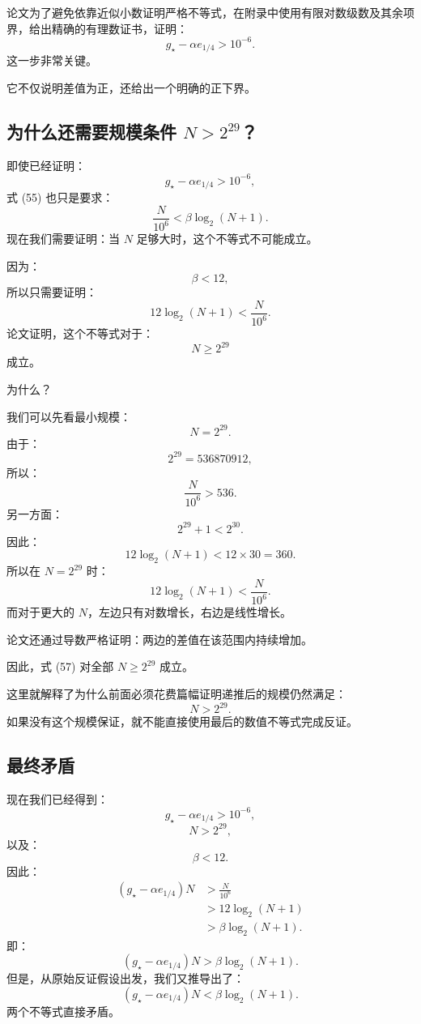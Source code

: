 \documentclass[UTF8,11pt]{ctexart}
\begin{document}
论文为了避免依靠近似小数证明严格不等式，在附录中使用有限对数级数及其余项界，给出精确的有理数证书，证明：
\begin{equation}\boxed{g_\star-\alpha e_{1/4}>10^{-6}.}\tag{56}\end{equation}
这一步非常关键。

它不仅说明差值为正，还给出一个明确的正下界。

\subsection{为什么还需要规模条件 $N>2^{29}$？}
即使已经证明：
\[g_\star-\alpha e_{1/4}>10^{-6},\]
式 (55) 也只是要求：
\[\frac{N}{10^6}<\beta\log_2(N+1).\]
现在我们需要证明：当 $N$ 足够大时，这个不等式不可能成立。

因为：
\[\beta<12,\]
所以只需要证明：
\begin{equation}\boxed{12\log_2(N+1)<\frac{N}{10^6}.}\tag{57}\end{equation}
论文证明，这个不等式对于：
\[N\ge2^{29}\]
成立。

为什么？

我们可以先看最小规模：
\[N=2^{29}.\]
由于：
\[2^{29}=536870912,\]
所以：
\[\frac N{10^6}>536.\]
另一方面：
\[2^{29}+1<2^{30}.\]
因此：
\[12\log_2(N+1)<12\times30=360.\]
所以在 $N=2^{29}$ 时：
\[12\log_2(N+1)<\frac N{10^6}.\]
而对于更大的 $N$，左边只有对数增长，右边是线性增长。

论文还通过导数严格证明：两边的差值在该范围内持续增加。

因此，式 (57) 对全部 $N\ge2^{29}$ 成立。

这里就解释了为什么前面必须花费篇幅证明递推后的规模仍然满足：
\[N>2^{29}.\]
如果没有这个规模保证，就不能直接使用最后的数值不等式完成反证。

\subsection{最终矛盾}
现在我们已经得到：
\[g_\star-\alpha e_{1/4}>10^{-6},\]
\[N>2^{29},\]
以及：
\[\beta<12.\]
因此：
\[
\begin{aligned}
(g_\star-\alpha e_{1/4})N&>\frac N{10^6}\\
&>12\log_2(N+1)\\
&>\beta\log_2(N+1).
\end{aligned}
\]
即：
\begin{equation}\boxed{(g_\star-\alpha e_{1/4})N>\beta\log_2(N+1).}\tag{58}\end{equation}
但是，从原始反证假设出发，我们又推导出了：
\[\boxed{(g_\star-\alpha e_{1/4})N<\beta\log_2(N+1).}\]
两个不等式直接矛盾。
\end{document}
